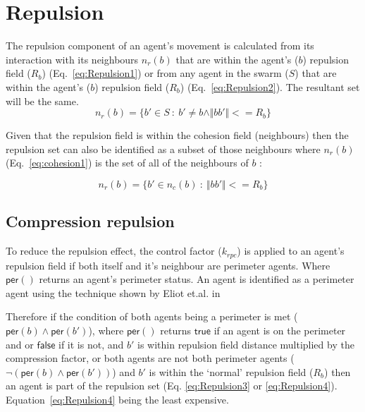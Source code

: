 \documentclass[12pt,a4paper]{article}
\newcommand{\magn}[1]{\Vert{#1}\Vert}
\begin{document}
\section{Repulsion}\label{repulsion}
The repulsion component of an agent's movement is calculated from its interaction with its neighbours $n_r(b)$ that are within the agent's ($b$) repulsion field ($R_b$) (Eq.~\ref{eq:Repulsion1}) or from any agent in the swarm ($S$) that are within the agent's ($b$) repulsion field ($R_b$) (Eq.~\ref{eq:Repulsion2}). The resultant set will be the same.\\

\begin{equation}\label{eq:Repulsion1}
n_r(b) = \{b' \in S~:~b' \neq b \land\magn{bb'} <= R_b\}
\end{equation}

Given that the repulsion field is within the cohesion field (neighbours) then the repulsion set can also be identified as a subset of those neighbours where $n_r(b)$ (Eq.~\ref{eq:cohesion1}) is the set of all of the neighbours of $b$ \cite{eliot2017methods}:

\begin{equation}\label{eq:Repulsion2}
n_r(b) = \{b' \in n_c(b)~:~\magn{bb'} <= R_b\}
\end{equation}

\subsection{Compression repulsion}

To reduce the repulsion effect, the control factor ($k_{rpc}$) is applied to an agent's repulsion field if both itself and it's neighbour are perimeter agents. Where $\mathsf{per}()$ returns an agent's perimeter status. An agent is identified as a perimeter agent using the technique shown by Eliot et.al. in \cite{eliot2019void}

Therefore if the condition of both agents being a perimeter is met ($\mathsf{per}(b)\wedge \mathsf{per}(b')$), where $\mathsf{per}()$ returns $\mathsf{true}$ if an agent is on the perimeter and or $\mathsf{false}$ if it is not, and $b'$ is within repulsion field distance multiplied by the compression factor, or both agents are not both perimeter agents ($\neg(\mathsf{per}(b)\wedge \mathsf{per}(b'))$) and $b'$ is within the `normal' repulsion field ($R_b$) then an agent is part of the repulsion set (Eq. \ref{eq:Repulsion3} or \ref{eq:Repulsion4}). Equation~\ref{eq:Repulsion4} being the least expensive.
\end{document}
